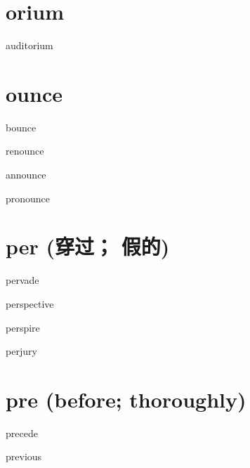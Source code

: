 \section{orium}

\begin{RefWord}{auditorium}
\end{RefWord}


\section{ounce}

\begin{RefWord}{bounce}
\end{RefWord}

\begin{RefWord}{renounce}
\end{RefWord}

\begin{RefWord}{announce}
\end{RefWord}

\begin{RefWord}{pronounce}
\end{RefWord}



\section{per (穿过； 假的)}


\begin{RefWord}{pervade}
\end{RefWord}

\begin{RefWord}{perspective}
\end{RefWord}

\begin{RefWord}{perspire}
\end{RefWord}

\begin{RefWord}{perjury}
\end{RefWord}

\section{pre (before; thoroughly)}
\begin{RefWord}{precede}
\end{RefWord}

\begin{RefWord}{previous}
\end{RefWord}

